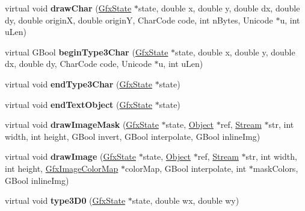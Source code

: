 \begin{DoxyCompactItemize}
\item 
\mbox{\label{class_arthur_output_dev_a7fbd036401adb7be5ce6d8aec39b48fa}} 
virtual void {\bfseries draw\+Char} (\hyperlink{class_gfx_state}{Gfx\+State} $\ast$state, double x, double y, double dx, double dy, double originX, double originY, Char\+Code code, int n\+Bytes, Unicode $\ast$u, int u\+Len)
\item 
\mbox{\label{class_arthur_output_dev_a40b2bf34059cfe32bad1507bef3d7ccb}} 
virtual G\+Bool {\bfseries begin\+Type3\+Char} (\hyperlink{class_gfx_state}{Gfx\+State} $\ast$state, double x, double y, double dx, double dy, Char\+Code code, Unicode $\ast$u, int u\+Len)
\item 
\mbox{\label{class_arthur_output_dev_aae10452421b89cf860904f3f86345d21}} 
virtual void {\bfseries end\+Type3\+Char} (\hyperlink{class_gfx_state}{Gfx\+State} $\ast$state)
\item 
\mbox{\label{class_arthur_output_dev_a250fbb6bdbcd670b7b5ed4399ce7cf28}} 
virtual void {\bfseries end\+Text\+Object} (\hyperlink{class_gfx_state}{Gfx\+State} $\ast$state)
\item 
\mbox{\label{class_arthur_output_dev_aa399c4039e6f42f8918f072241a2aa13}} 
virtual void {\bfseries draw\+Image\+Mask} (\hyperlink{class_gfx_state}{Gfx\+State} $\ast$state, \hyperlink{class_object}{Object} $\ast$ref, \hyperlink{class_stream}{Stream} $\ast$str, int width, int height, G\+Bool invert, G\+Bool interpolate, G\+Bool inline\+Img)
\item 
\mbox{\label{class_arthur_output_dev_aa0e29e0a1558510c6c5f811b13f1e783}} 
virtual void {\bfseries draw\+Image} (\hyperlink{class_gfx_state}{Gfx\+State} $\ast$state, \hyperlink{class_object}{Object} $\ast$ref, \hyperlink{class_stream}{Stream} $\ast$str, int width, int height, \hyperlink{class_gfx_image_color_map}{Gfx\+Image\+Color\+Map} $\ast$color\+Map, G\+Bool interpolate, int $\ast$mask\+Colors, G\+Bool inline\+Img)
\item 
\mbox{\label{class_arthur_output_dev_a460467dd2aa76e820bd8c8761a3e7a22}} 
virtual void {\bfseries type3\+D0} (\hyperlink{class_gfx_state}{Gfx\+State} $\ast$state, double wx, double wy)

\end{DoxyCompactItemize}
